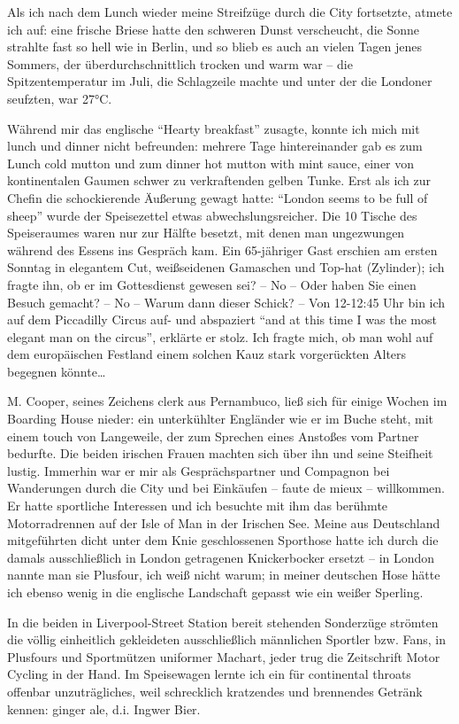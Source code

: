\documentclass[a5paper,pagesize,10pt,twoside=true]{scrbook}
\begin{document}
Als ich nach dem Lunch wieder meine Streifzüge durch die City fortsetzte, atmete ich auf: eine frische Briese hatte den schweren Dunst verscheucht, die Sonne strahlte fast so hell wie in Berlin, und so blieb es auch an vielen Tagen jenes Sommers, der überdurchschnittlich trocken und warm war -- die Spitzentemperatur im Juli, die Schlagzeile machte und unter der die Londoner seufzten, war 27°C.

Während mir das englische \enquote{Hearty breakfast} zusagte, konnte ich mich mit lunch und dinner nicht befreunden: mehrere Tage hintereinander gab es zum Lunch cold mutton und zum dinner hot mutton with mint sauce, einer von kontinentalen Gaumen schwer zu verkraftenden gelben Tunke. Erst als ich zur Chefin die schockierende Äußerung gewagt hatte: \enquote{London seems to be full of sheep} wurde der Speisezettel etwas abwechslungsreicher. Die 10 Tische des Speiseraumes waren nur zur Hälfte besetzt, mit denen man ungezwungen während des Essens ins Gespräch kam. Ein 65-jähriger Gast erschien am ersten Sonntag in elegantem Cut, weißseidenen Gamaschen und Top-hat (Zylinder); ich fragte ihn, ob er im Gottesdienst gewesen sei? -- No -- Oder haben Sie einen Besuch gemacht? -- No -- Warum dann dieser Schick? -- Von 12-12:45 Uhr bin ich auf dem Piccadilly Circus auf- und abspaziert \enquote{and at this time I was the most elegant man on the circus}, erklärte er stolz. Ich fragte mich, ob man wohl auf dem europäischen Festland einem solchen Kauz stark vorgerückten Alters begegnen könnte\dots

M. Cooper, seines Zeichens clerk aus Pernambuco, ließ sich für einige Wochen im Boarding House nieder: ein unterkühlter Engländer wie er im Buche steht, mit einem touch von Langeweile, der zum Sprechen eines Anstoßes vom Partner bedurfte. Die beiden irischen Frauen machten sich über ihn und seine Steifheit lustig. Immerhin war er mir als Gesprächspartner und Compagnon bei Wanderungen durch die City und bei Einkäufen -- faute de mieux -- willkommen. Er hatte sportliche Interessen und ich besuchte mit ihm das berühmte Motorradrennen auf der Isle of Man in der Irischen See. Meine aus Deutschland mitgeführten dicht unter dem Knie geschlossenen Sporthose hatte ich durch die damals ausschließlich in London getragenen Knickerbocker ersetzt -- in London nannte man sie Plusfour, ich weiß nicht warum; in meiner deutschen Hose hätte ich ebenso wenig in die englische Landschaft gepasst wie ein weißer Sperling.

In die beiden in Liverpool-Street Station bereit stehenden Sonderzüge strömten die völlig einheitlich gekleideten ausschließlich männlichen Sportler bzw. Fans, in Plusfours und Sportmützen uniformer Machart, jeder trug die Zeitschrift Motor Cycling in der Hand. Im Speisewagen lernte ich ein für continental throats offenbar unzuträgliches, weil schrecklich kratzendes und brennendes Getränk kennen: ginger ale, d.i. Ingwer Bier.
\end{document}
